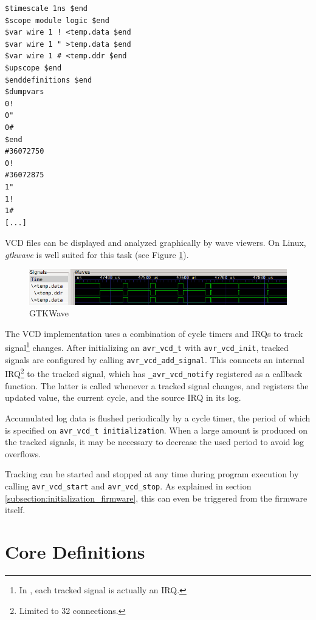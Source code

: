 \begin{verbatim}
$timescale 1ns $end
$scope module logic $end
$var wire 1 ! <temp.data $end
$var wire 1 " >temp.data $end
$var wire 1 # <temp.ddr $end
$upscope $end
$enddefinitions $end
$dumpvars
0!
0"
0#
$end
#36072750
0!
#36072875
1"
1!
1#
[...]
\end{verbatim}


\ac{VCD} files can be displayed and analyzed graphically by wave viewers. On Linux,
\emph{gtkwave} is well suited for this task (see Figure \ref{fig:gtkwave}).

\begin{figure}
\includegraphics[width=\textwidth]{images/gtkwave}
\caption{GTKWave}
\label{fig:gtkwave}
\end{figure}

The \simavr \ac{VCD} implementation uses a combination of cycle timers
and \acp{IRQ} to track signal\footnote{
%
In \simavr, each tracked signal is actually an \ac{IRQ}.
%
} changes. After initializing an \lstinline|avr_vcd_t|
with \lstinline|avr_vcd_init|, tracked signals are configured by calling
\lstinline|avr_vcd_add_signal|. This connects an internal \ac{IRQ}\footnote{
Limited to 32 connections.} to the tracked signal, which has
\lstinline|_avr_vcd_notify| registered as a callback function. The latter is
called whenever a tracked signal changes, and registers the updated value, the
current cycle, and the source \ac{IRQ} in its log.

Accumulated log data is flushed periodically by a cycle timer, the period of
which is specified on \lstinline|avr_vcd_t initialization|. When a large amount
is produced on the tracked signals, it may be necessary to decrease the used
period to avoid log overflows.

Tracking can be started and stopped at any time during program execution by
calling \lstinline|avr_vcd_start| and \lstinline|avr_vcd_stop|. As explained in
section \ref{subsection:initialization_firmware}, this can even be triggered from the
firmware itself.


\section{Core Definitions}

